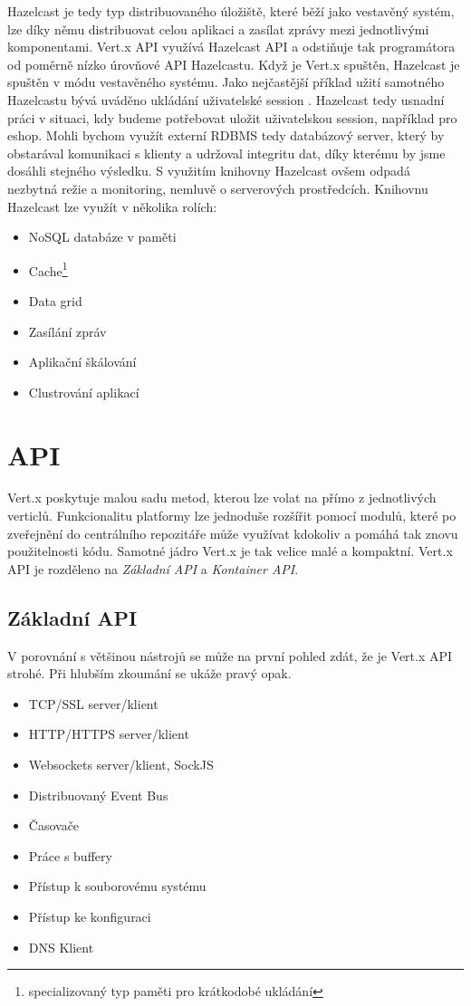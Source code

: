 Hazelcast je tedy typ distribuovaného úložiště, které běží jako vestavěný systém, lze díky němu distribuovat celou aplikaci a zasílat zprávy mezi jednotlivými komponentami. Vert.x API využívá Hazelcast API a odstiňuje tak programátora od poměrně nízko úrovňové API Hazelcastu. Když je Vert.x spuštěn, Hazelcast je spuštěn v módu vestavěného systému. Jako nejčastější příklad užití samotného Hazelcastu bývá uváděno ukládání uživatelské session \cite{session}. Hazelcast tedy usnadní práci v situaci, kdy budeme potřebovat uložit uživatelskou session, například pro eshop. Mohli bychom využít externí RDBMS tedy databázový server, který by obstarával komunikaci s klienty a udržoval integritu dat, díky kterému by jsme dosáhli stejného výsledku. S využitím knihovny Hazelcast ovšem odpadá nezbytná režie a monitoring, nemluvě o serverových prostředcích.
Knihovnu Hazelcast lze využít v několika rolích:
\begin{itemize}
\item{NoSQL databáze v paměti}
\item{Cache\footnote{specializovaný typ paměti pro krátkodobé ukládání}}
\item{Data grid}
\item{Zasílání zpráv}
\item{Aplikační škálování}
\item{Clustrování aplikací}
\end{itemize}

\section{API}\label{sub:API}

Vert.x poskytuje malou sadu metod, kterou lze volat na přímo z jednotlivých verticlů.
Funkcionalitu platformy lze jednoduše rozšířit pomocí modulů, které po zveřejnění do centrálního repozitáře může využívat kdokoliv a pomáhá tak znovu použitelnosti kódu. Samotné jádro Vert.x je tak velice malé a kompaktní. Vert.x API je rozděleno na \emph{Základní API} a \emph{Kontainer API}.

\subsection{Základní API}\label{sub:coreAPI}

V porovnání s většinou nástrojů se může na první pohled zdát, že je Vert.x API strohé. Při hlubším zkoumání se ukáže pravý opak.

\begin{itemize}
\item{TCP/SSL server/klient}
\item{HTTP/HTTPS server/klient}
\item{Websockets server/klient, SockJS}
\item{Distribuovaný Event Bus}
\item{Časovače}
\item{Práce s buffery}
\item{Přístup k souborovému systému}
\item{Přístup ke konfiguraci}
\item{DNS Klient}
\end{itemize}

